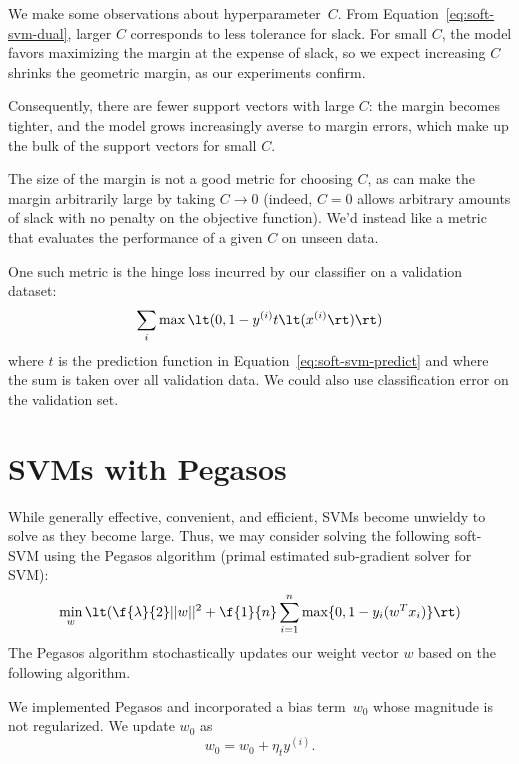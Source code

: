 \documentclass{article}
\newcommand{\sind}[1]{^{(#1)}}
\begin{document}
\begin{multicols}{2}
We make some observations about hyperparameter~$C$.
From Equation~\ref{eq:soft-svm-dual},
larger $C$ corresponds to less tolerance for slack.
For small $C$, the model favors
maximizing the margin at the expense of slack,
so we expect increasing $C$ shrinks the geometric margin,
as our experiments confirm.

Consequently, there are fewer support vectors with large $C$:
the margin becomes tighter,
and the model grows increasingly averse to margin errors,
which make up the bulk of the support vectors for small $C$.

The size of the margin
is not a good metric for choosing $C$,
as can make the margin arbitrarily large
by taking $C \to 0$
(indeed, $C = 0$ allows arbitrary amounts of slack
with no penalty on the objective function).
We'd instead like a metric that evaluates
the performance of a given $C$
on unseen data.

One such metric is the hinge loss incurred
by our classifier on a validation dataset:
\begin{equation}
    \sum_{i} \max\lt(0, 1 - y\sind{i} t\lt(x\sind{i}\rt)\rt)
\end{equation}
where $t$ is the prediction function in Equation~\ref{eq:soft-svm-predict}
and where the sum is taken over all validation data.
We could also use classification error on the validation set.



\section{SVMs with Pegasos}

While generally effective, convenient, and efficient,
SVMs become unwieldy to solve as they become large.
Thus, we may consider solving the following soft-SVM
using the Pegasos algorithm
(primal estimated sub-gradient solver for SVM):
\begin{equation}
   \min_w \lt( \f{\lambda}{2}||w||^2 + \f{1}{n}\sum_{i=1}^n{\max\{0,1-y_i(w^Tx_i)\}} \rt)
\end{equation}
The Pegasos algorithm stochastically updates our weight vector $w$ based on the following algorithm.


We implemented Pegasos and incorporated a bias term~$w_0$ whose magnitude is not regularized.
We update $w_0$ as
\begin{equation}\label{eq:pegasos-svm}
    w_0 = w_0 + \eta_t y^{(i)}.
\end{equation}


\end{multicols}
\end{document}
